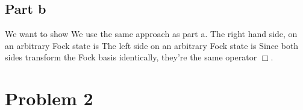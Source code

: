 \subsection*{Part b}
We want to show
We use the same approach as part a. The right hand side, on an arbitrary Fock state is
The left side on an arbitrary Fock state is
Since both sides transform the Fock basis identically, they're the same operator $\Box$.

\newpage
\section*{Problem 2}
